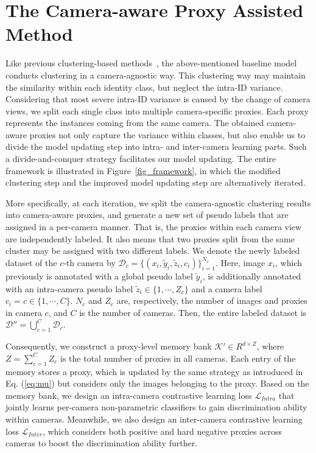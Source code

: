 \documentclass[letterpaper]{article} %
\begin{document}
\section{The Camera-aware Proxy Assisted Method}
Like previous clustering-based methods~\cite{unsup_clustering,lin2019aBottom,zeng2020hierarchical,zhai2020ad}, the above-mentioned baseline model conducts clustering in a camera-agnostic way. This clustering way may maintain the similarity within each identity class, but neglect the intra-ID variance. Considering that most severe intra-ID variance is caused by the change of camera views, we split each single class into multiple camera-specific proxies. Each proxy represents the instances coming from the same camera. The obtained camera-aware proxies not only capture the variance within classes, but also enable us to divide the model updating step into intra- and inter-camera learning parts. Such a divide-and-conquer strategy facilitates our model updating. The entire framework is illustrated in Figure~\ref{fig_framework}, in which the modified clustering step and the improved model updating step are alternatively iterated.



More specifically, at each iteration, we split the camera-agnostic clustering results into camera-aware proxies, and generate a new set of pseudo labels that are assigned in a per-camera manner. That is, the proxies within each camera view are independently labeled. It also means that two proxies split from the same cluster may be assigned with two different labels. We denote the newly labeled dataset of the $c$-th camera by $\mathcal{D}_c = \{(x_i, \tilde{y}_i, \tilde{z}_i, c_i)\}_{i=1}^{N_c}$. Here, image $x_i$, which previously is annotated with a global pseudo label $\tilde{y}_i$, is additionally annotated with an intra-camera pseudo label $\tilde{z}_i \in \{1, \cdots, Z_c\}$ and a camera label $c_i = c \in \{1, \cdots, C\}$. $N_c$ and $Z_c$ are, respectively, the number of images and proxies in camera $c$, and $C$ is the number of cameras. Then, the entire labeled dataset is $\mathcal{D}''=\bigcup_{c=1}^C \mathcal{D}_c$.

Consequently, we construct a proxy-level memory bank $\mathcal{K}'\in R^{d \times Z}$, where $Z=\sum_{c=1}^C Z_c$ is the total number of proxies in all cameras. Each entry of the memory stores a proxy, which is updated by the same strategy as introduced in Eq. (\ref{eq:mu}) but considers only the images belonging to the proxy. Based on the memory bank, we design an intra-camera contrastive learning loss $\mathcal{L}_{Intra}$ that jointly learns per-camera non-parametric classifiers to gain discrimination ability within cameras. Meanwhile, we also design an inter-camera contrastive learning loss $\mathcal{L}_{Inter}$, which considers both positive and hard negative proxies across cameras to boost the discrimination ability further.
\end{document}
